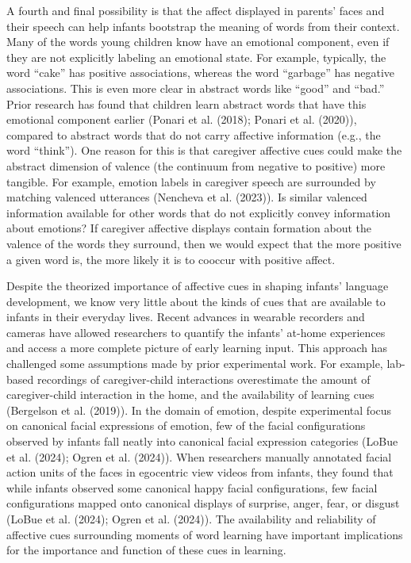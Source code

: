 \documentclass[10pt, letterpaper]{article}
\begin{document}
A fourth and final possibility is that the affect displayed in parents'
faces and their speech can help infants bootstrap the meaning of words
from their context. Many of the words young children know have an
emotional component, even if they are not explicitly labeling an
emotional state. For example, typically, the word ``cake'' has positive
associations, whereas the word ``garbage'' has negative associations.
This is even more clear in abstract words like ``good'' and ``bad.''
Prior research has found that children learn abstract words that have
this emotional component earlier (Ponari et al. (2018); Ponari et al.
(2020)), compared to abstract words that do not carry affective
information (e.g., the word ``think''). One reason for this is that
caregiver affective cues could make the abstract dimension of valence
(the continuum from negative to positive) more tangible. For example,
emotion labels in caregiver speech are surrounded by matching valenced
utterances (Nencheva et al. (2023)). Is similar valenced information
available for other words that do not explicitly convey information
about emotions? If caregiver affective displays contain formation about
the valence of the words they surround, then we would expect that the
more positive a given word is, the more likely it is to cooccur with
positive affect.

Despite the theorized importance of affective cues in shaping infants'
language development, we know very little about the kinds of cues that
are available to infants in their everyday lives. Recent advances in
wearable recorders and cameras have allowed researchers to quantify the
infants' at-home experiences and access a more complete picture of early
learning input. This approach has challenged some assumptions made by
prior experimental work. For example, lab-based recordings of
caregiver-child interactions overestimate the amount of caregiver-child
interaction in the home, and the availability of learning cues
(Bergelson et al. (2019)). In the domain of emotion, despite
experimental focus on canonical facial expressions of emotion, few of
the facial configurations observed by infants fall neatly into canonical
facial expression categories (LoBue et al. (2024); Ogren et al. (2024)).
When researchers manually annotated facial action units of the faces in
egocentric view videos from infants, they found that while infants
observed some canonical happy facial configurations, few facial
configurations mapped onto canonical displays of surprise, anger, fear,
or disgust (LoBue et al. (2024); Ogren et al. (2024)). The availability
and reliability of affective cues surrounding moments of word learning
have important implications for the importance and function of these
cues in learning.
\end{document}
